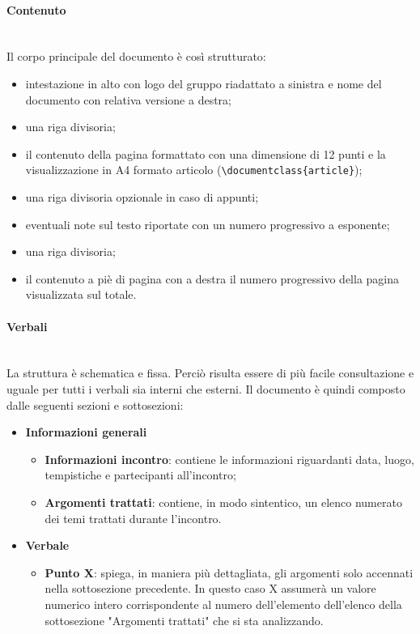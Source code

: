 	        \paragraph*{Contenuto}\mbox{}\\ [1mm]
	            Il corpo principale del documento è così strutturato:
	            \begin{itemize}
	                \item intestazione in alto con logo del gruppo riadattato a sinistra e nome del documento con relativa versione a destra;
	                \item una riga divisoria;
	                \item il contenuto della pagina formattato con una dimensione di 12 punti e la visualizzazione in A4 formato articolo
	                      (\verb|\documentclass{article}|);
	                \item una riga divisoria opzionale in caso di appunti;
	                \item eventuali note sul testo riportate con un numero progressivo a esponente;
	                \item una riga divisoria;
	                \item il contenuto a piè di pagina con a destra il numero progressivo della pagina visualizzata sul totale.
	            \end{itemize}
	        \paragraph*{Verbali}\mbox{}\\ [1mm]
	            La struttura è schematica e fissa. Perciò risulta essere di più facile consultazione e uguale per tutti i verbali sia interni che esterni. Il documento è quindi composto dalle seguenti sezioni e sottosezioni:
	            \begin{itemize}
	                \item \textbf{Informazioni generali}
	                \begin{itemize}
	                    \item \textbf{Informazioni incontro}: contiene le informazioni riguardanti data, luogo, tempistiche e partecipanti all'incontro;
	                    \item \textbf{Argomenti trattati}: contiene, in modo sintentico, un elenco numerato dei temi trattati durante l'incontro.
	                \end{itemize}
	                \item \textbf{Verbale}
	                \begin{itemize}
	                    \item \textbf{Punto X}: spiega, in maniera più dettagliata, gli argomenti solo accennati nella sottosezione precedente. In questo caso X assumerà un valore numerico intero corrispondente al numero dell'elemento dell'elenco della sottosezione "Argomenti trattati" che si sta analizzando.
	                \end{itemize}
	            \end{itemize}
